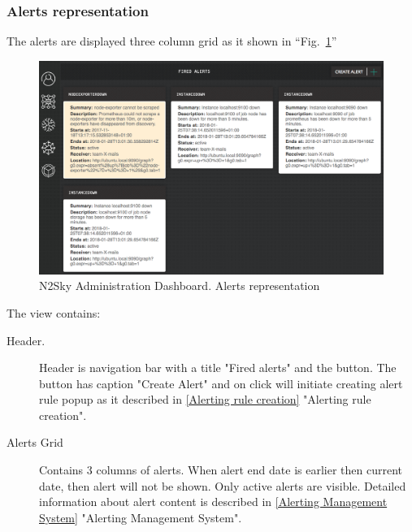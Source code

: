 \subsubsection{Alerts representation}\label{Alerts representation}

The alerts are displayed three column grid as it shown in ``Fig.~\ref{fig:alert_representation}'' 

\begin{figure}[htbp]
\begin{center}
  \includegraphics[width=\linewidth]{components/4/pics/alert_representation.png}
  \caption{N2Sky Administration Dashboard. Alerts representation}
  \label{fig:alert_representation}
\end{center}
\end{figure}

The view contains:

\begin{description}
\item[Header.] Header is navigation bar  with a title "Fired alerts" and the button. The button has caption "Create Alert" and on click will initiate creating alert rule popup as it described in \autoref{Alerting rule creation} "Alerting rule creation".
\item[Alerts Grid] Contains 3 columns of alerts. When alert end date is earlier then current date, then alert will not be shown. Only active alerts are visible. Detailed information about  alert content is described in \autoref{Alerting Management System} "Alerting Management System".
\end{description}


